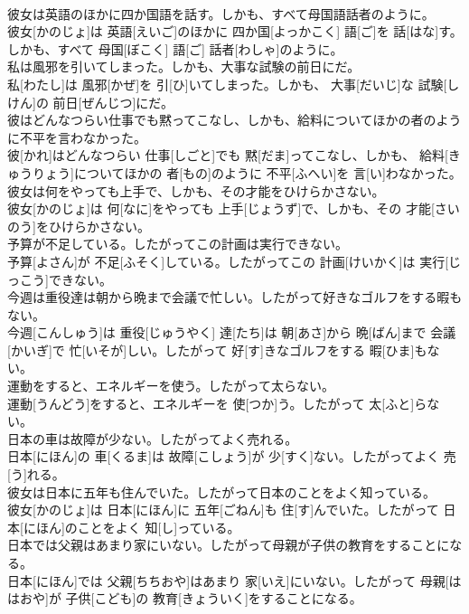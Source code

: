 \documentclass[8pt]{extreport}
\begin{document}
\begin{CJK}{UTF8}{min}
\\	彼女は英語のほかに四か国語を話す。しかも、すべて母国語話者のように。	
\\	彼女[かのじょ]は 英語[えいご]のほかに 四か国[よっかこく] 語[ご]を 話[はな]す。しかも、すべて 母国[ぼこく] 語[ご] 話者[わしゃ]のように。
\\	私は風邪を引いてしまった。しかも、大事な試験の前日にだ。	
\\	私[わたし]は 風邪[かぜ]を 引[ひ]いてしまった。しかも、 大事[だいじ]な 試験[しけん]の 前日[ぜんじつ]にだ。
\\	彼はどんなつらい仕事でも黙ってこなし、しかも、給料についてほかの者のように不平を言わなかった。	
\\	彼[かれ]はどんなつらい 仕事[しごと]でも 黙[だま]ってこなし、しかも、 給料[きゅうりょう]についてほかの 者[もの]のように 不平[ふへい]を 言[い]わなかった。
\\	彼女は何をやっても上手で、しかも、その才能をひけらかさない。	
\\	彼女[かのじょ]は 何[なに]をやっても 上手[じょうず]で、しかも、その 才能[さいのう]をひけらかさない。
\\	予算が不足している。したがってこの計画は実行できない。	
\\	予算[よさん]が 不足[ふそく]している。したがってこの 計画[けいかく]は 実行[じっこう]できない。
\\	今週は重役達は朝から晩まで会議で忙しい。したがって好きなゴルフをする暇もない。	
\\	今週[こんしゅう]は 重役[じゅうやく] 達[たち]は 朝[あさ]から 晩[ばん]まで 会議[かいぎ]で 忙[いそが]しい。したがって 好[す]きなゴルフをする 暇[ひま]もない。
\\	運動をすると、エネルギーを使う。したがって太らない。	
\\	運動[うんどう]をすると、エネルギーを 使[つか]う。したがって 太[ふと]らない。
\\	日本の車は故障が少ない。したがってよく売れる。	
\\	日本[にほん]の 車[くるま]は 故障[こしょう]が 少[すく]ない。したがってよく 売[う]れる。
\\	彼女は日本に五年も住んでいた。したがって日本のことをよく知っている。	
\\	彼女[かのじょ]は 日本[にほん]に 五年[ごねん]も 住[す]んでいた。したがって 日本[にほん]のことをよく 知[し]っている。
\\	日本では父親はあまり家にいない。したがって母親が子供の教育をすることになる。	
\\	日本[にほん]では 父親[ちちおや]はあまり 家[いえ]にいない。したがって 母親[ははおや]が 子供[こども]の 教育[きょういく]をすることになる。

\end{CJK}
\end{document}
